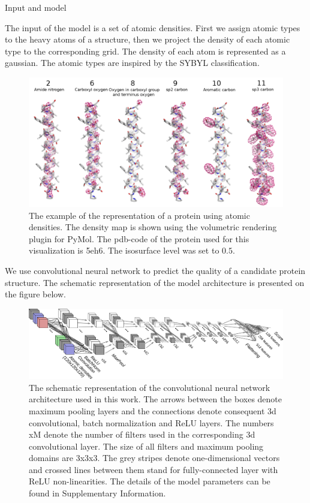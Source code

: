\documentclass[final, unknownkeysallowed]{beamer}
\begin{document}
\begin{frame}{}
\begin{textblock}{39.0}
\begin{block}{Input and model}

The input of the model is a set of atomic densities. First we assign atomic types to the heavy atoms of a structure, 
then we project the density of each atomic type to the corresponding grid. The density of each atom is represented 
as a gaussian. The atomic types are inspired by the SYBYL classification.

\begin{figure}[H]
    \centering
    \includegraphics[width=0.7\linewidth]{../draft/Fig/atomic_densities_V3.png}
    \caption{The example of the representation of a protein using atomic densities. The density map is 
    shown using the volumetric rendering plugin for PyMol. The pdb-code of the protein used for this visualization is 5eh6.
    The isosurface level was set to $0.5$.}
    \label{Fig:atomic_densities}
\end{figure}

We use convolutional neural network to predict the quality of a candidate protein structure. The 
schematic representation of the model architecture is presented on the figure below.

\begin{figure}[H]
    \centering
    \includegraphics[width=\linewidth]{../draft/Fig/ConvnetDiagramV1.png}
    \caption{The schematic representation of the convolutional neural network architecture used in this work. 
    The arrows between the boxes denote maximum pooling layers and the connections denote 
    consequent 3d convolutional, batch normalization and ReLU layers. The numbers xM denote the number of filters 
    used in the corresponding 3d convolutional layer. The size of all filters and 
    maximum pooling domains are 3x3x3. The grey stripes denote one-dimensional vectors and crossed lines between them 
    stand for fully-connected layer with ReLU non-linearities. The details of the model parameters can be found in 
    Supplementary Information.}
    \label{Fig:CNNModel}
\end{figure}


\end{block}
\end{textblock}
\end{frame}
\end{document}
